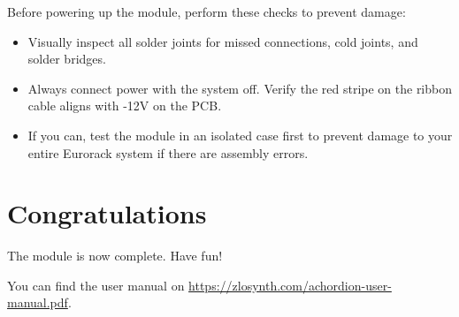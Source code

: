 \documentclass[10pt,a4paper,twocolumn]{article}
\begin{document}
Before powering up the module, perform these checks to prevent damage:

\begin{itemize}
  \item Visually inspect all solder joints for missed connections, cold joints, and solder bridges.
  \item Always connect power with the system off. Verify the red stripe on the ribbon cable aligns with -12V on the PCB.
  \item If you can, test the module in an isolated case first to prevent damage to your entire Eurorack system if there are assembly errors.
\end{itemize}

\section{Congratulations}

The module is now complete. Have fun!

You can find the user manual on \url{https://zlosynth.com/achordion-user-manual.pdf}.
\end{document}
